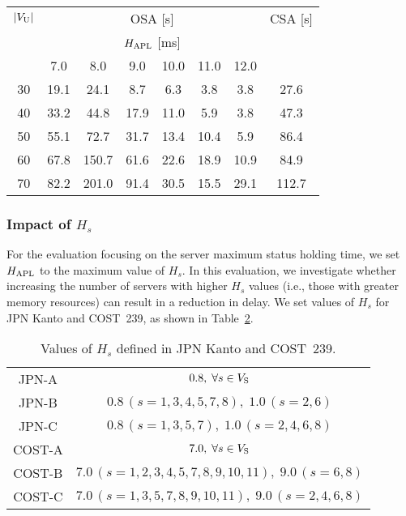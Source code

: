 \documentclass[conference]{IEEEtran}
\begin{document}
\begin{CJK}{UTF8}{ipxm}
\begin{table}[t]
  \label{tab:ComputationTime_OSA_CSA_hapl_COST}
  \vspace{-0.3cm}
  \begin{center}
    \begin{tabular}{c|cccccc|c}
      \hline
      $|V_{\rm{U}}|$ & \multicolumn{6}{c|}{OSA [s]} & CSA [s] \\ \cline{2-7}
       & \multicolumn{6}{c|}{$H_{\rm{APL}}$ [ms]} & \\
       & 7.0 & 8.0 & 9.0 & 10.0 & 11.0 & 12.0 &  \\
      \hline
      30 & 19.1 &  24.1 &  8.7 &  6.3 &  3.8 &  3.8 &  27.6 \\
      40 & 33.2 &  44.8 & 17.9 & 11.0 &  5.9 &  3.8 &  47.3 \\
      50 & 55.1 &  72.7 & 31.7 & 13.4 & 10.4 &  5.9 &  86.4 \\
      60 & 67.8 & 150.7 & 61.6 & 22.6 & 18.9 & 10.9 &  84.9 \\
      70 & 82.2 & 201.0 & 91.4 & 30.5 & 15.5 & 29.1 & 112.7 \\
      \hline
    \end{tabular}
  \end{center}
\end{table}

\subsubsection{Impact of $H_s$}
For the evaluation focusing on the server maximum status holding time, we set $H_{\rm APL}$ to the maximum value of $H_s$.
In this evaluation, we investigate whether increasing the number of servers with higher $H_s$ values (i.e., those with greater memory resources) can result in a reduction in delay.
We set values of $H_s$ for JPN Kanto and COST~239, as shown in Table~\ref{tab:condition_hs_JPN_COST}.
\begin{table}[t]
  \caption{Values of $H_s$ defined in JPN Kanto and COST~239.}
  \label{tab:condition_hs_JPN_COST}
  \vspace{-0.3cm}
  \begin{center}
    \begin{tabular}{c|c}
      \hline
      JPN-A & $0.8,\; \forall s \in V_{\rm S}$ \\
      JPN-B & $0.8\,(s=1,3,4,5,7,8),\;1.0\,(s=2,6)$ \\
      JPN-C & $0.8\,(s=1,3,5,7),\;1.0\,(s=2,4,6,8)$ \\
      \hline
      COST-A & $7.0,\; \forall s \in V_{\rm S}$ \\
      COST-B & $7.0\,(s=1,2,3,4,5,7,8,9,10,11),\;9.0\,(s=6,8)$ \\
      COST-C & $7.0\,(s=1,3,5,7,8,9,10,11),\;9.0\,(s=2,4,6,8)$ \\
      \hline
    \end{tabular}
  \end{center}
\end{table}


\end{CJK}
\end{document}
